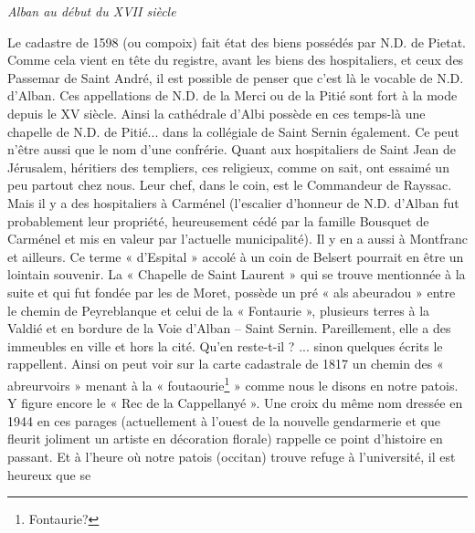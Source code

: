 \begin{center}
    {\Large\itshape Alban au début du XVII\ieme{} siècle}
\end{center}

\vspace{1em}

Le cadastre de 1598 (ou compoix) fait état des biens possédés
par N.D. de Pietat. Comme cela vient en tête du registre,
avant les biens des hospitaliers, et ceux des Passemar de
Saint André, il est possible de penser que c'est là le vocable
de N.D. d'Alban. Ces appellations de N.D. de la Merci ou de
la Pitié sont fort à la mode depuis le XV\ieme{} siècle.
Ainsi la cathédrale d'Albi possède en ces temps-là une
chapelle de N.D. de Pitié... dans la collégiale de Saint
Sernin également. Ce peut n'être aussi que le nom d'une
confrérie. Quant aux hospitaliers de Saint Jean de Jérusalem,
héritiers des templiers, ces religieux, comme on sait, ont
essaimé un peu partout chez nous. Leur chef, dans le coin,
est le Commandeur de Rayssac. Mais il y a des hospitaliers
à Carménel (l'escalier d'honneur de N.D. d'Alban fut
probablement leur propriété, heureusement cédé par la
famille Bousquet de Carménel et mis en valeur par
l'actuelle municipalité). Il y en a aussi à Montfranc et
ailleurs. Ce terme « d'Espital » accolé à un coin de
Belsert pourrait en être un lointain souvenir. La
« Chapelle de Saint Laurent » qui se trouve mentionnée
à la suite et qui fut fondée par les de Moret, possède
un pré « als abeuradou » entre le chemin de Peyreblanque
et celui de la « Fontaurie », plusieurs terres à la Valdié
et en bordure de la Voie d'Alban -- Saint Sernin.
Pareillement, elle a des immeubles en ville et hors la cité.
Qu'en reste-t-il ? ... sinon quelques écrits le rappellent.
Ainsi on peut voir sur la carte cadastrale de 1817 un
chemin des « abreurvoirs » menant à la « foutaourie\footnote{Fontaurie?} »
comme nous le disons en notre patois. Y figure encore
le « Rec de la Cappellanyé ». Une croix du même nom
dressée en 1944 en ces parages (actuellement à l'ouest
de la nouvelle gendarmerie et que fleurit joliment un
artiste en décoration florale) rappelle ce point d'histoire
en passant. Et à l'heure où notre patois (occitan) trouve
refuge à l'université, il est heureux que se